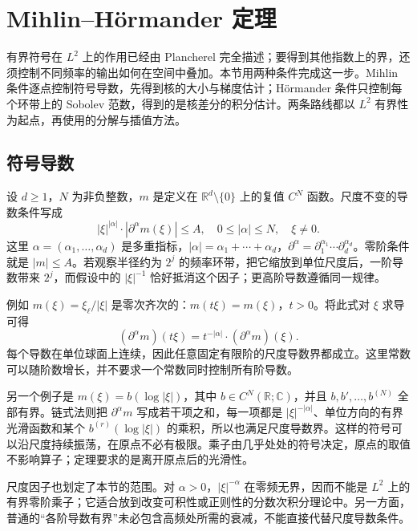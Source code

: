 \section{Mihlin–Hörmander 定理}
\label{b2:sec:2202}

有界符号在 \(L^2\) 上的作用已经由 Plancherel 完全描述；要得到其他指数上的界，还须控制不同频率的输出如何在空间中叠加。本节用两种条件完成这一步。Mihlin 条件逐点控制符号导数，先得到核的大小与梯度估计；Hörmander 条件只控制每个环带上的 Sobolev 范数，得到的是核差分的积分估计。两条路线都以 \(L^2\) 有界性为起点，再使用的分解与插值方法。

\subsection{符号导数}
\label{b2:subsec:220201}

设 \(d\geq1\)，\(N\) 为非负整数，\(m\) 是定义在 \(\mathbb R^d\setminus\{0\}\) 上的复值 \(C^N\) 函数。尺度不变的导数条件写成
\[
 |\xi|^{|\alpha|}\cdot|\partial^\alpha m(\xi)|\leq A,
 \quad 0\leq|\alpha|\leq N,\quad \xi\ne0.
\]
这里 \(\alpha=(\alpha_1,\ldots,\alpha_d)\) 是多重指标，\(|\alpha|=\alpha_1+\cdots+\alpha_d\)，\(\partial^\alpha=\partial_1^{\alpha_1}\cdots\partial_d^{\alpha_d}\)。零阶条件就是 \(|m|\leq A\)。若观察半径约为 \(2^j\) 的频率环带，把它缩放到单位尺度后，一阶导数带来 \(2^j\)，而假设中的 \(|\xi|^{-1}\) 恰好抵消这个因子；更高阶导数遵循同一规律。

\ProseParagraphBreak
例如 \(m(\xi)=\xi_\ell/|\xi|\) 是零次齐次的：\(m(t\xi)=m(\xi)\)，\(t>0\)。将此式对 \(\xi\) 求导可得
\[
 (\partial^\alpha m)(t\xi)
 =t^{-|\alpha|}\cdot(\partial^\alpha m)(\xi).
\]
每个导数在单位球面上连续，因此任意固定有限阶的尺度导数界都成立。这里常数可以随阶数增长，并不要求一个常数同时控制所有阶导数。

\ProseParagraphBreak
另一个例子是 \(m(\xi)=b(\log|\xi|)\)，其中 \(b\in C^N(\mathbb R;\mathbb C)\)，并且 \(b,b',\ldots,b^{(N)}\) 全部有界。链式法则把 \(\partial^\alpha m\) 写成若干项之和，每一项都是 \(|\xi|^{-|\alpha|}\)、单位方向的有界光滑函数和某个 \(b^{(r)}(\log|\xi|)\) 的乘积，所以也满足尺度导数界。这样的符号可以沿尺度持续振荡，在原点不必有极限。乘子由几乎处处的符号决定，原点的取值不影响算子；定理要求的是离开原点后的光滑性。

\ProseParagraphBreak
尺度因子也划定了本节的范围。对 \(\alpha>0\)，\(|\xi|^{-\alpha}\) 在零频无界，因而不能是 \(L^2\) 上的有界零阶乘子；它适合放到改变可积性或正则性的分数次积分理论中。另一方面，普通的“各阶导数有界”未必包含高频处所需的衰减，不能直接代替尺度导数条件。

